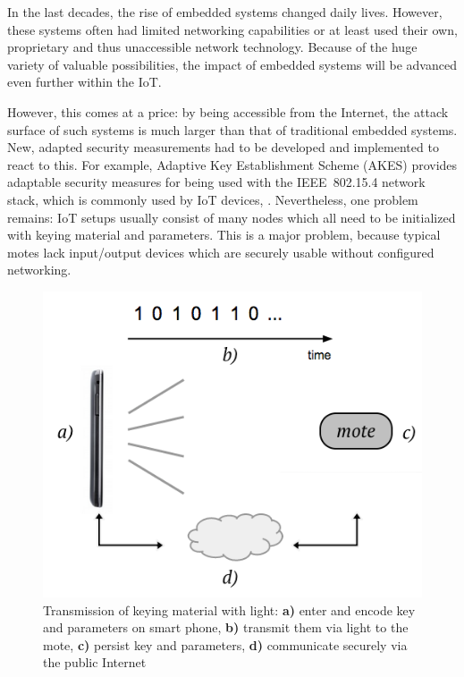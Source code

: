 \documentclass{sig-alternate} %
\begin{document}
In the last decades, the rise of embedded systems changed daily lives.
However, these systems often had limited networking capabilities or at least used their own, proprietary and thus unaccessible network technology.
Because of the huge variety of valuable possibilities, the impact of embedded systems will be advanced even further within the IoT.

However, this comes at a price: by being accessible from the Internet, the attack surface of such systems is much larger than that of traditional embedded systems.
New, adapted security measurements had to be developed and implemented to react to this.
For example, Adaptive Key Establishment Scheme (AKES) provides adaptable security measures for being used with the IEEE~802.15.4 network stack, which is commonly used by IoT devices, \cite{krentz15akes}.
Nevertheless, one problem remains: IoT setups usually consist of many nodes which all need to be initialized with keying material and parameters.
This is a major problem, because typical motes lack input/output devices which are securely usable without configured networking.

\begin{figure}
	\centering
	\includegraphics[scale=.4]{images/overview.png}
	\caption{Transmission of keying material with light: \textbf{a)} enter and encode key and parameters on smart phone, \textbf{b)} transmit them via light to the mote, \textbf{c)} persist key and parameters, \textbf{d)} communicate securely via the public Internet }
	\label{fig:overview}
\end{figure}
\end{document}
